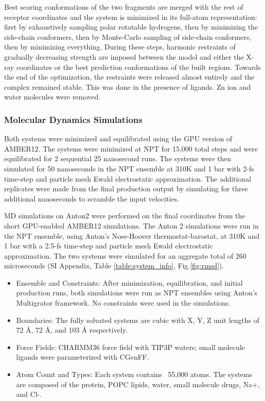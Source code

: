 Best scoring conformations of the two fragments are merged with the rest of receptor coordinates and the system is minimized in its full-atom representation: first by exhaustively sampling polar rotatable hydrogens, then by minimizing the side-chain conformers, then by Monte-Carlo sampling of side-chain conformers, then by minimizing everything. During these steps, harmonic restraints of gradually decreasing strength are imposed between the model and either the X-ray coordinates or the best prediction conformations of the built regions. Towards the end of the optimization, the restraints were released almost entirely and the complex remained stable. This was done in the presence of ligands. Zn ion and water molecules were removed.

\subsubsection{Molecular Dynamics Simulations} Both systems were minimized and equilibrated using the GPU version of AMBER12. The systems were minimized at NPT for 15,000 total steps and were equilibrated for 2 sequential 25 nanosecond runs. The systems were then simulated for 50 nanoseconds in the NPT ensemble at 310K and 1 bar with 2-fs time-step and particle mesh Ewald electrostatic approximation. The additional replicates were made from the final production output by simulating for three additional nanoseconds to scramble the input velocities.

MD simulations on Anton2 were performed on the final coordinates from the short GPU-enabled AMBER12 simulations. The Anton 2 simulations were run in the NPT ensemble, using Anton's Nose-Hoover thermostat-barostat, at 310K and 1 bar with a 2.5-fs time-step and particle mesh Ewald electrostatic approximation. The two systems were simulated for an aggregate total of 260 microseconds (SI Appendix, Table \ref{table:system_info}, Fig.\ref{fig:rmsd}).

\begin{itemize}
  \item Ensemble and Constraints: After minimization, equilibration, and initial production runs, both simulations were run as NPT ensembles using Anton's Multigrator framework. No constraints were used in the simulations.
  \item Boundaries: The fully solvated systems are cubic with X, Y, Z unit lengths of 72 \si{\angstrom}, 72 \si{\angstrom}, and 103 \si{\angstrom} respectively.
  \item Force Fields: CHARMM36 force field with TIP3P waters; small molecule ligands were parameterized with CGenFF.
  \item Atom Count and Types: Each system contains ~55,000 atoms. The systems are composed of the protein, POPC lipids, water, small molecule drugs, Na+, and Cl-.
\end{itemize}

